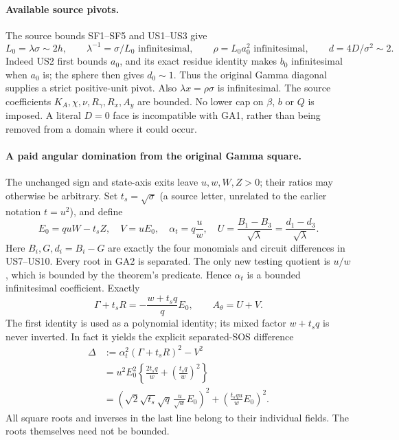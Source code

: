 \paragraph{Available source pivots.}
The source bounds SF1--SF5 and US1--US3 give
\[
 L_0=\lambda\sigma\sim2h,\qquad
 \lambda^{-1}=\sigma/L_0\text{ infinitesimal},\qquad
 \rho=L_0a_0^2\text{ infinitesimal},\qquad
 d=4D/\sigma^2\sim2.
 \tag{GA1}
\]
Indeed US2 first bounds $a_0$, and its exact residue identity makes
$b_0$ infinitesimal when $a_0$ is; the sphere then gives $d_0\sim1$.
Thus the original Gamma diagonal supplies a strict positive-unit
pivot. Also $\lambda x=\rho\sigma$ is infinitesimal. The source
coefficients $K_A,\chi,\nu,R_\gamma,R_x,A_y$ are bounded. No
lower cap on $\beta$, $b$ or $Q$ is imposed. A literal $D=0$ face
is incompatible with GA1, rather than being removed from a domain
where it could occur.

\paragraph{A paid angular domination from the original Gamma square.}
The unchanged sign and state-axis exits leave $u,w,W,Z>0$; their
ratios may otherwise be arbitrary. Set $t_s=\sqrt\sigma$ (a source
letter, unrelated to the earlier notation $t=u^2$), and define
\[
 E_0=quW-t_s Z,\quad V=uE_0,\quad
 \alpha_t=q\frac uw,\quad
 U=\frac{B_1-B_3}{\sqrt\lambda}
   =\frac{d_1-d_3}{\sqrt\lambda}.
 \tag{GA2}
\]
Here $B_i,G,d_i=B_i-G$ are exactly the four monomials and circuit
differences in US7--US10. Every root in GA2 is separated. The only
new testing quotient is $u/w$, which is bounded by the theorem's
predicate. Hence $\alpha_t$ is a bounded infinitesimal coefficient.
Exactly
\[
 \Gamma+t_sR=-\frac{w+t_sq}{q}E_0,
 \qquad A_\theta=U+V.
 \tag{GA3}
\]
The first identity is used as a polynomial identity; its mixed
factor $w+t_sq$ is never inverted. In fact it yields the explicit
separated-SOS difference
\[
\begin{split}
 \Delta&:=\alpha_t^2(\Gamma+t_sR)^2-V^2\\
 &=u^2E_0^2\left\{\frac{2t_sq}{w}
                            +\left(\frac{t_sq}{w}\right)^2\right\}\\
 &=\left(\sqrt2\sqrt{t_s}\sqrt q\,
                  \frac{u}{\sqrt w}E_0\right)^2
   +\left(\frac{t_squ}{w}E_0\right)^2.
\end{split}\tag{GA4}
\]
All square roots and inverses in the last line belong to their
individual fields. The roots themselves need not be bounded.

